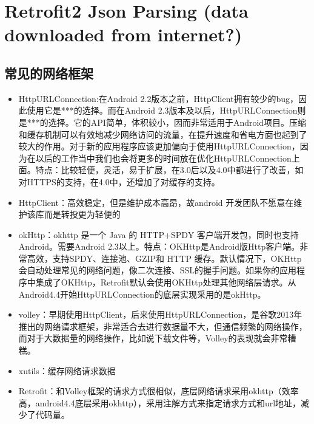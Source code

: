 \documentclass[9pt, b5paper]{article}
\begin{document}
\section{Retrofit2 Json Parsing (data downloaded from internet?)}
\label{sec-3}
\subsection{常见的网络框架}
\label{sec-3-1}
\begin{itemize}
\item HttpURLConnection:在Android 2.2版本之前，HttpClient拥有较少的bug，因此使用它是***的选择。而在Android 2.3版本及以后，HttpURLConnection则是***的选择。它的API简单，体积较小，因而非常适用于Android项目。压缩和缓存机制可以有效地减少网络访问的流量，在提升速度和省电方面也起到了较大的作用。对于新的应用程序应该更加偏向于使用HttpURLConnection，因为在以后的工作当中我们也会将更多的时间放在优化HttpURLConnection上面。特点：比较轻便，灵活，易于扩展，在3.0后以及4.0中都进行了改善，如对HTTPS的支持，在4.0中，还增加了对缓存的支持。
\item HttpClient：高效稳定，但是维护成本高昂，故android 开发团队不愿意在维护该库而是转投更为轻便的
\item okHttp：okhttp 是一个 Java 的 HTTP+SPDY 客户端开发包，同时也支持 Android。需要Android 2.3以上。特点：OKHttp是Android版Http客户端。非常高效，支持SPDY、连接池、GZIP和 HTTP 缓存。默认情况下，OKHttp会自动处理常见的网络问题，像二次连接、SSL的握手问题。如果你的应用程序中集成了OKHttp，Retrofit默认会使用OKHttp处理其他网络层请求。从Android4.4开始HttpURLConnection的底层实现采用的是okHttp。
\item volley：早期使用HttpClient，后来使用HttpURLConnection，是谷歌2013年推出的网络请求框架，非常适合去进行数据量不大，但通信频繁的网络操作，而对于大数据量的网络操作，比如说下载文件等，Volley的表现就会非常糟糕。
\item xutils：缓存网络请求数据
\item Retrofit：和Volley框架的请求方式很相似，底层网络请求采用okhttp（效率高，android4.4底层采用okhttp），采用注解方式来指定请求方式和url地址，减少了代码量。
\end{itemize}
\end{document}
